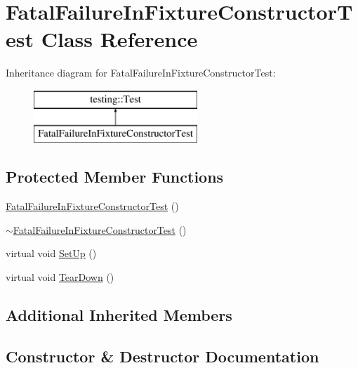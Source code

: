 \hypertarget{class_fatal_failure_in_fixture_constructor_test}{}\section{Fatal\+Failure\+In\+Fixture\+Constructor\+Test Class Reference}
\label{class_fatal_failure_in_fixture_constructor_test}
Inheritance diagram for Fatal\+Failure\+In\+Fixture\+Constructor\+Test\+:\begin{figure}[H]
\begin{center}
\leavevmode
\includegraphics[height=2.000000cm]{class_fatal_failure_in_fixture_constructor_test}
\end{center}
\end{figure}
\subsection*{Protected Member Functions}
\begin{DoxyCompactItemize}
\item 
\hyperlink{class_fatal_failure_in_fixture_constructor_test_a1dc9a5fcf0e1f22d614990a0fe2cb504}{Fatal\+Failure\+In\+Fixture\+Constructor\+Test} ()
\item 
\hyperlink{class_fatal_failure_in_fixture_constructor_test_a514709af7159172a12193a7508683c46}{$\sim$\+Fatal\+Failure\+In\+Fixture\+Constructor\+Test} ()
\item 
virtual void \hyperlink{class_fatal_failure_in_fixture_constructor_test_a006d3ac0e7a4ad3c469c3b41dc7c42c3}{Set\+Up} ()
\item 
virtual void \hyperlink{class_fatal_failure_in_fixture_constructor_test_a2763026a557e1fce4e59bd16c4eced57}{Tear\+Down} ()
\end{DoxyCompactItemize}
\subsection*{Additional Inherited Members}


\subsection{Constructor \& Destructor Documentation}
\hypertarget{class_fatal_failure_in_fixture_constructor_test_a1dc9a5fcf0e1f22d614990a0fe2cb504}{}
